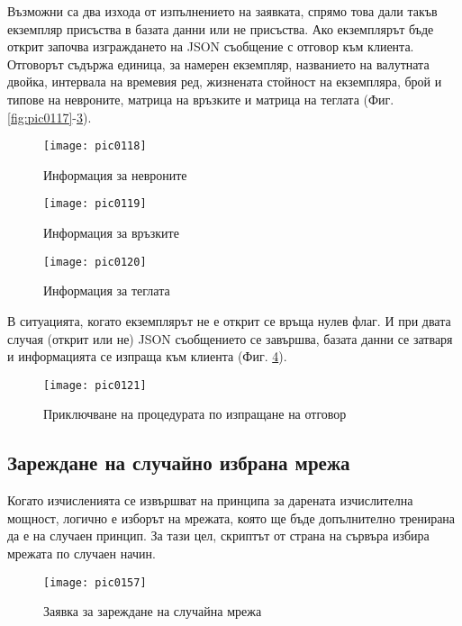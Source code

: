 Възможни са два изхода от изпълнението на заявката, спрямо това дали такъв екземпляр присъства в базата данни или не присъства. Ако екземплярът бъде открит започва изграждането на JSON съобщение с отговор към клиента. Отговорът съдържа единица, за намерен екземпляр, названието на валутната двойка, интервала на времевия ред, жизнената стойност на екземпляра, брой и типове на невроните, матрица на връзките и матрица на теглата (Фиг. \ref{fig:pic0117}-\ref{fig:pic0120}).

\begin{figure}[h]
  \centering
  \texttt{[image: pic0118]}
  \caption{Информация за невроните}
\label{fig:pic0118}
\end{figure}
\FloatBarrier

\begin{figure}[h]
  \centering
  \texttt{[image: pic0119]}
  \caption{Информация за връзките}
\label{fig:pic0119}
\end{figure}
\FloatBarrier

\begin{figure}[h]
  \centering
  \texttt{[image: pic0120]}
  \caption{Информация за теглата}
\label{fig:pic0120}
\end{figure}
\FloatBarrier

В ситуацията, когато екземплярът не е открит се връща нулев флаг. И при двата случая (открит или не) JSON съобщението се завършва, базата данни се затваря и информацията се изпраща към клиента (Фиг. \ref{fig:pic0121}).

\begin{figure}[h]
  \centering
  \texttt{[image: pic0121]}
  \caption{Приключване на процедурата по изпращане на отговор}
\label{fig:pic0121}
\end{figure}
\FloatBarrier

\subsection{Зареждане на случайно избрана мрежа}

Когато изчисленията се извършват на принципа за дарената изчислителна мощност, логично е изборът на мрежата, която ще бъде допълнително тренирана  да е на случаен принцип. За тази цел, скриптът от страна на сървъра избира мрежата по случаен начин.

\begin{figure}[h]
  \centering
  \texttt{[image: pic0157]}
  \caption{Заявка за зареждане на случайна мрежа}
\label{fig:pic0157}
\end{figure}
\FloatBarrier

